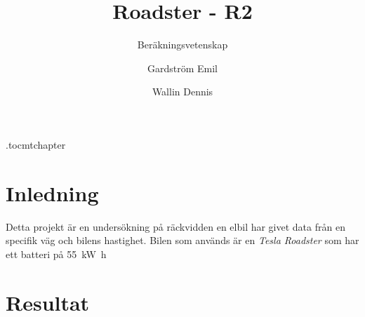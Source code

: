 \documentclass[]{scrreprt}
\title{Roadster - R2}
\author{Gardström Emil \and Wallin Dennis}
\subtitle{Beräkningsvetenskap \RON{1}}
\begin{document}
\etocdepthtag.toc{mtchapter}
\maketitle
{}
%
\tableofcontents
\chapter{Inledning}
Detta projekt är en undersökning på räckvidden en elbil har givet data från en specifik väg och bilens hastighet. Bilen som används är en \textit{Tesla Roadster} som har ett batteri på \SI{55}{\kilo\watt\hour}
\chapter{Resultat}
\end{document}
